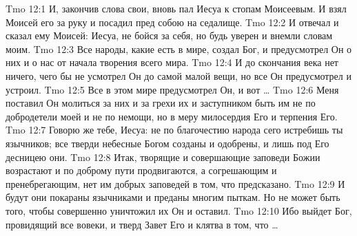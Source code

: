 \vs Tmo 12:1
И, закончив слова свои, вновь пал Иесуа к стопам Моисеевым. И взял Моисей его за руку и посадил пред собою на седалище.
\vs Tmo 12:2
И отвечал и сказал ему Моисей: Иесуа, не бойся за себя, но будь уверен и внемли словам моим.
\vs Tmo 12:3
Все народы, какие есть в мире, создал Бог, и предусмотрел Он о них и о нас от начала творения всего мира.
\vs Tmo 12:4
И до скончания века нет ничего, чего бы не усмотрел Он до самой малой вещи, но все Он предусмотрел и устроил.
\vs Tmo 12:5
Все в этом мире предусмотрел Он, и вот \ldots
\vs Tmo 12:6
Меня поставил Он молиться за них и за грехи их и заступником быть им не по добродетели моей и не по немощи, но в меру милосердия Его и терпения Его.
\vs Tmo 12:7
Говорю же тебе, Иесуа: не по благочестию народа сего истребишь ты язычников; все тверди небесные Богом созданы и одобрены, и лишь под Его десницею они.
\vs Tmo 12:8
Итак, творящие и совершающие заповеди Божии возрастают и по доброму пути продвигаются, а согрешающим и пренебрегающим, нет им добрых заповедей в том, что предсказано.
\vs Tmo 12:9
И будут они покараны язычниками и преданы многим пыткам. Но не может быть того, чтобы совершенно уничтожил их Он и оставил.
\vs Tmo 12:10
Ибо выйдет Бог, провидящий все вовеки, и тверд Завет Его и клятва в том, что \ldots
